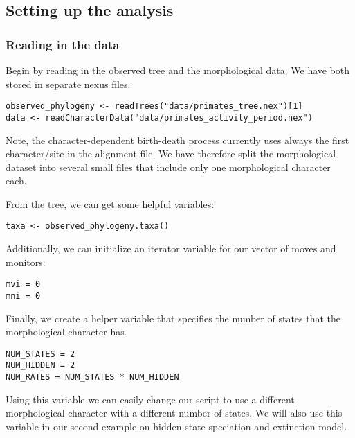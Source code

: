 \subsection{Setting up the analysis}

\subsubsection{Reading in the data}

Begin by reading in the observed tree and the morphological data. 
We have both stored in separate nexus files.
{\tt \begin{snugshade*}
\begin{lstlisting}
observed_phylogeny <- readTrees("data/primates_tree.nex")[1]
data <- readCharacterData("data/primates_activity_period.nex")
\end{lstlisting}
\end{snugshade*}}
Note, the character-dependent birth-death process currently uses always the first character/site in the alignment file.
We have therefore split the morphological dataset into several small files that include only one morphological character each.

From the tree, we can get some helpful variables:
{\tt \begin{snugshade*}
\begin{lstlisting}
taxa <- observed_phylogeny.taxa()
\end{lstlisting}
\end{snugshade*}}

Additionally, we can initialize an iterator variable for our vector of moves and monitors:
{\tt \begin{snugshade*}
\begin{lstlisting}
mvi = 0
mni = 0
\end{lstlisting}
\end{snugshade*}}

Finally, we create a helper variable that specifies the number of states that the morphological character has.
{\tt \begin{snugshade*}
\begin{lstlisting}
NUM_STATES = 2
NUM_HIDDEN = 2
NUM_RATES = NUM_STATES * NUM_HIDDEN
\end{lstlisting}
\end{snugshade*}}
Using this variable we can easily change our script to use a different morphological character with a different number of states.
We will also use this variable in our second example on hidden-state speciation and extinction model. 


